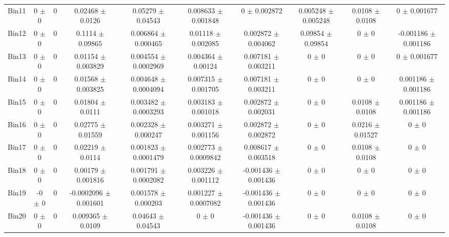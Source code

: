\begin{tabular}{@{\extracolsep{4pt}}lccccccccc@{}}
     Bin11 & 0 $\pm$ 0 & 0 & 0.02468 $\pm$ 0.0126 & 0.05279 $\pm$ 0.04543 & 0.008633 $\pm$ 0.001848 & 0 $\pm$ 0.002872 & 0.005248 $\pm$ 0.005248 & 0.0108 $\pm$ 0.0108 & 0 $\pm$ 0.001677 \\ 
     Bin12 & 0 $\pm$ 0 & 0 & 0.1114 $\pm$ 0.09865 & 0.006864 $\pm$ 0.000465 & 0.01118 $\pm$ 0.002085 & 0.002872 $\pm$ 0.004062 & 0.09854 $\pm$ 0.09854 & 0 $\pm$ 0 & -0.001186 $\pm$ 0.001186 \\ 
     Bin13 & 0 $\pm$ 0 & 0 & 0.01154 $\pm$ 0.003829 & 0.004554 $\pm$ 0.0002969 & 0.004364 $\pm$ 0.00124 & 0.007181 $\pm$ 0.003211 & 0 $\pm$ 0 & 0 $\pm$ 0 & 0 $\pm$ 0.001677 \\ 
     Bin14 & 0 $\pm$ 0 & 0 & 0.01568 $\pm$ 0.003825 & 0.004648 $\pm$ 0.0004094 & 0.007315 $\pm$ 0.001705 & 0.007181 $\pm$ 0.003211 & 0 $\pm$ 0 & 0 $\pm$ 0 & 0.001186 $\pm$ 0.001186 \\ 
     Bin15 & 0 $\pm$ 0 & 0 & 0.01804 $\pm$ 0.0111 & 0.003482 $\pm$ 0.0003293 & 0.003183 $\pm$ 0.001018 & 0.002872 $\pm$ 0.002031 & 0 $\pm$ 0 & 0.0108 $\pm$ 0.0108 & 0.001186 $\pm$ 0.001186 \\ 
     Bin16 & 0 $\pm$ 0 & 0 & 0.02775 $\pm$ 0.01559 & 0.002328 $\pm$ 0.000247 & 0.003271 $\pm$ 0.001156 & 0.002872 $\pm$ 0.002872 & 0 $\pm$ 0 & 0.0216 $\pm$ 0.01527 & 0 $\pm$ 0 \\ 
     Bin17 & 0 $\pm$ 0 & 0 & 0.02219 $\pm$ 0.0114 & 0.001823 $\pm$ 0.0001479 & 0.002773 $\pm$ 0.0009842 & 0.008617 $\pm$ 0.003518 & 0 $\pm$ 0 & 0.0108 $\pm$ 0.0108 & 0 $\pm$ 0 \\ 
     Bin18 & 0 $\pm$ 0 & 0 & 0.00179 $\pm$ 0.001816 & 0.001791 $\pm$ 0.0002082 & 0.003226 $\pm$ 0.001112 & -0.001436 $\pm$ 0.001436 & 0 $\pm$ 0 & 0 $\pm$ 0 & 0 $\pm$ 0 \\ 
     Bin19 & -0 $\pm$ 0 & 0 & -0.0002096 $\pm$ 0.001601 & 0.001578 $\pm$ 0.000203 & 0.001227 $\pm$ 0.0007082 & -0.001436 $\pm$ 0.001436 & 0 $\pm$ 0 & 0 $\pm$ 0 & 0 $\pm$ 0 \\ 
     Bin20 & 0 $\pm$ 0 & 0 & 0.009365 $\pm$ 0.0109 & 0.04643 $\pm$ 0.04543 & 0 $\pm$ 0 & -0.001436 $\pm$ 0.001436 & 0 $\pm$ 0 & 0.0108 $\pm$ 0.0108 & 0 $\pm$ 0 \\ 
\hline\hline
  \end{tabular}
